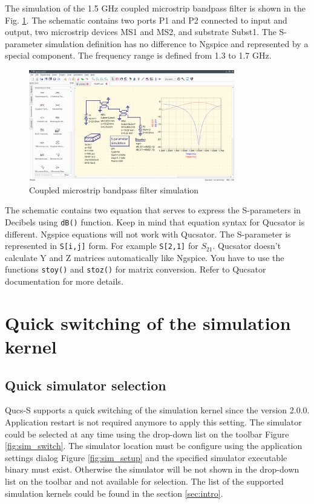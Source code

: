 \documentclass[a4paper,12pt]{article}
\begin{document}
The simulation of the 1.5 GHz coupled microstrip bandpass filter is shown in the Fig. \ref{fig:mlin}. The schematic contains two ports P1 and P2 connected to input and output, two microstrip devices MS1 and MS2, and substrate Subst1. The S-parameter simulation definition has no difference to Ngspice and represented by a special component. The frequency range is defined from 1.3 to 1.7 GHz.  

    \begin{figure}[!ht]
    \begin{center}
        \includegraphics[width=0.8\textwidth]{img/filt_mlin.png}
    \end{center}
    \caption{Coupled microstrip bandpass filter simulation} \label{fig:mlin}
    \end{figure}
    
The schematic contains two equation that serves to express the S-parameters in Decibels using \verb|dB()| function. Keep in mind that equation syntax for Qucsator is different. Ngspice equations will not work with Qucsator. The S-parameter is represented in \verb|S[i,j]| form. For example \verb|S[2,1]| for $S_{21}$. Qucsator doesn't calculate Y and Z matrices automatically like Ngspice. You have to use the functions \verb|stoy()| and \verb|stoz()| for matrix conversion. Refer to Qucsator documentation for more details.
    
\section{Quick switching of the simulation kernel} \label{sec:quick_sw}

\subsection{Quick simulator selection}

Qucs-S supports a quick switching of the simulation kernel since the version 2.0.0. Application restart is not required anymore to apply this setting. The simulator could be selected at any time using the drop-down list on the toolbar Figure \ref{fig:sim_switch}. The simulator location must be configure using the application settings dialog Figure \ref{fig:sim_setup} and the specified simulator executable binary must exist. Otherwise the simulator will be not shown in the drop-down list on the toolbar and not available for selection. The list of the supported simulation kernels could be found in the section \ref{sec:intro}.
\end{document}
